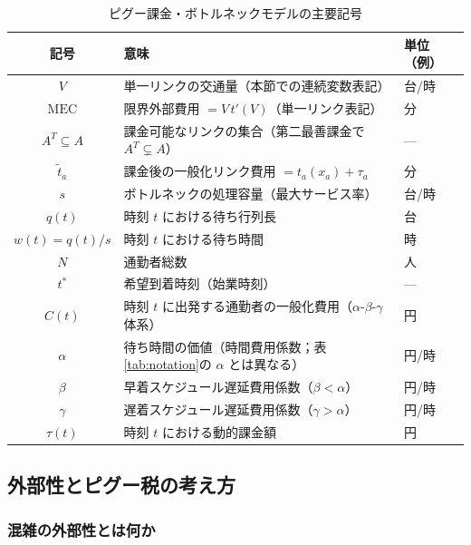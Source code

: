 \begin{table}[hbtp]
  \centering
  \caption{ピグー課金・ボトルネックモデルの主要記号}
  \label{tab:ch7-notation}
  \begin{tabular}{cll}
    \toprule
    記号 & 意味 & 単位（例） \\
    \midrule
    $V$                & 単一リンクの交通量（本節での連続変数表記） & 台/時 \\
    $\mathrm{MEC}$     & 限界外部費用 $= V\,t'(V)$（単一リンク表記） & 分 \\
    $A^T \subseteq A$  & 課金可能なリンクの集合（第二最善課金で $A^T \subsetneq A$） & — \\
    $\tilde{t}_a$      & 課金後の一般化リンク費用 $= t_a(x_a) + \tau_a$ & 分 \\
    $s$                & ボトルネックの処理容量（最大サービス率） & 台/時 \\
    $q(t)$             & 時刻 $t$ における待ち行列長 & 台 \\
    $w(t) = q(t)/s$    & 時刻 $t$ における待ち時間 & 時 \\
    $N$                & 通勤者総数 & 人 \\
    $t^*$              & 希望到着時刻（始業時刻） & — \\
    $C(t)$             & 時刻 $t$ に出発する通勤者の一般化費用（$\alpha$-$\beta$-$\gamma$ 体系） & 円 \\
    $\alpha$           & 待ち時間の価値（時間費用係数；表\ref{tab:notation}の $\alpha$ とは異なる） & 円/時 \\
    $\beta$            & 早着スケジュール遅延費用係数（$\beta<\alpha$） & 円/時 \\
    $\gamma$           & 遅着スケジュール遅延費用係数（$\gamma>\alpha$） & 円/時 \\
    $\tau(t)$          & 時刻 $t$ における動的課金額 & 円 \\
    \bottomrule
  \end{tabular}
\end{table}

\subsection{外部性とピグー税の考え方}
\label{subsec:pigou-externality}

\subsubsection*{混雑の外部性とは何か}

